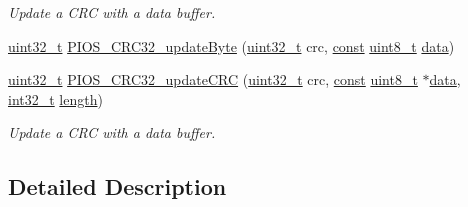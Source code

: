 \begin{DoxyCompactItemize}
\begin{DoxyCompactList}\small\item\em Update a C\-R\-C with a data buffer. \end{DoxyCompactList}\item 
\hyperlink{stdint_8h_a435d1572bf3f880d55459d9805097f62}{uint32\-\_\-t} \hyperlink{group___p_i_o_s___c_r_c_ga3ee1918a6a3be58dc0554a7c99529f7b}{P\-I\-O\-S\-\_\-\-C\-R\-C32\-\_\-update\-Byte} (\hyperlink{stdint_8h_a435d1572bf3f880d55459d9805097f62}{uint32\-\_\-t} crc, \hyperlink{group___n_a_m_e_ga7ae6d0e43244213b34de2c2b9aa30da6}{const} \hyperlink{stdint_8h_aba7bc1797add20fe3efdf37ced1182c5}{uint8\-\_\-t} \hyperlink{pios__opahrs__proto_8h_a20e3f4bfaeccf09a75ef27e095a10112}{data})
\item 
\hyperlink{stdint_8h_a435d1572bf3f880d55459d9805097f62}{uint32\-\_\-t} \hyperlink{group___p_i_o_s___c_r_c_ga377c7e542bd4d088e213ca5376afaf9b}{P\-I\-O\-S\-\_\-\-C\-R\-C32\-\_\-update\-C\-R\-C} (\hyperlink{stdint_8h_a435d1572bf3f880d55459d9805097f62}{uint32\-\_\-t} crc, \hyperlink{group___n_a_m_e_ga7ae6d0e43244213b34de2c2b9aa30da6}{const} \hyperlink{stdint_8h_aba7bc1797add20fe3efdf37ced1182c5}{uint8\-\_\-t} $\ast$\hyperlink{pios__opahrs__proto_8h_a20e3f4bfaeccf09a75ef27e095a10112}{data}, \hyperlink{group___n_a_m_e_gafd12020da5a235dfcf0c3c748fb5baed}{int32\-\_\-t} \hyperlink{mavlink__helpers_8h_a4254bfa282bd215965d99b8d6b527a04}{length})
\begin{DoxyCompactList}\small\item\em Update a C\-R\-C with a data buffer. \end{DoxyCompactList}\end{DoxyCompactItemize}


\subsection{Detailed Description}


